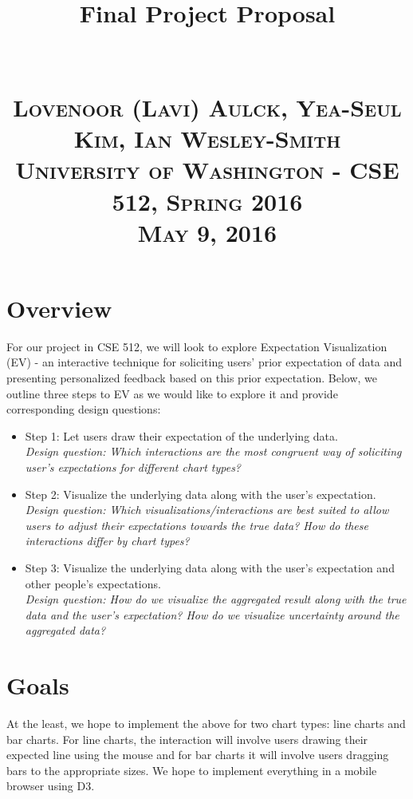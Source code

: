 \documentclass[paper=a4, fontsize=11pt]{article} %
\title{
\vspace{-2cm}
\normalfont 
\horrule{0.5pt} \\ [0.5 cm]%
\vspace{-0.5cm}
\LARGE Final Project Proposal \\%
\vspace{-0.5cm}
\horrule{2pt} \\%
\large
\renewcommand{\baselinestretch}{1}
\textsc{\\ Lovenoor (Lavi) Aulck, Yea-Seul Kim, Ian Wesley-Smith \\ University of Washington - CSE 512, Spring 2016 \\ May 9, 2016}%
\renewcommand{\baselinestretch}{1}
\date{}
}
\begin{document}
\maketitle

\vspace{-2cm}
\section*{Overview}
For our project in CSE 512, we will look to explore Expectation Visualization (EV) - an interactive technique for soliciting users' prior expectation of data and presenting personalized feedback based on this prior expectation. Below, we outline three steps to EV as we would like to explore it and provide corresponding design questions: 

\begin{itemize}

\item Step 1: Let users draw their expectation of the underlying data. \\
\textit{Design question: Which interactions are the most congruent way of soliciting user's expectations for different chart types?}

\item Step 2: Visualize the underlying data along with the user's expectation. \\
\textit{Design question: Which visualizations/interactions are best suited to allow users to adjust their expectations towards the true data? How do these interactions differ by chart types?}

\item Step 3: Visualize the underlying data along with the user's expectation and other people's expectations. \\
\textit{Design question: How do we visualize the aggregated result along with the true data and the user's expectation? How do we visualize uncertainty around the aggregated data?}
\end{itemize}

\section*{Goals}
At the least, we hope to implement the above for two chart types: line charts and bar charts. For line charts, the interaction will involve users drawing their expected line using the mouse and for bar charts it will involve users dragging bars to the appropriate sizes. We hope to implement everything in a mobile browser using D3.
\end{document}
